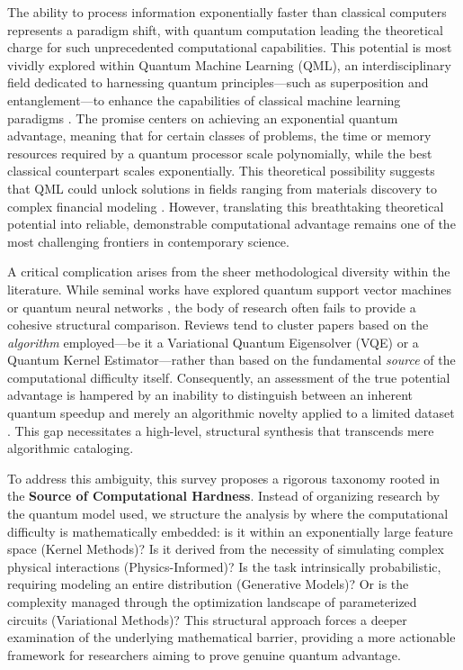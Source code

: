 \documentclass{article}
\begin{document}
\label{sec:introduction}

The ability to process information exponentially faster than classical computers represents a paradigm shift, with quantum computation leading the theoretical charge for such unprecedented computational capabilities. This potential is most vividly explored within Quantum Machine Learning (QML), an interdisciplinary field dedicated to harnessing quantum principles---such as superposition and entanglement---to enhance the capabilities of classical machine learning paradigms \cite{zeguendry2023quantum}. The promise centers on achieving an exponential quantum advantage, meaning that for certain classes of problems, the time or memory resources required by a quantum processor scale polynomially, while the best classical counterpart scales exponentially. This theoretical possibility suggests that QML could unlock solutions in fields ranging from materials discovery to complex financial modeling \cite{egger2020quantum}. However, translating this breathtaking theoretical potential into reliable, demonstrable computational advantage remains one of the most challenging frontiers in contemporary science.

A critical complication arises from the sheer methodological diversity within the literature. While seminal works have explored quantum support vector machines  or quantum neural networks \cite{chakraborty2020analytical}, the body of research often fails to provide a cohesive structural comparison. Reviews tend to cluster papers based on the \textit{algorithm} employed---be it a Variational Quantum Eigensolver (VQE) or a Quantum Kernel Estimator---rather than based on the fundamental \textit{source} of the computational difficulty itself. Consequently, an assessment of the true potential advantage is hampered by an inability to distinguish between an inherent quantum speedup and merely an algorithmic novelty applied to a limited dataset \cite{raubitzek2023applicability}. This gap necessitates a high-level, structural synthesis that transcends mere algorithmic cataloging.

To address this ambiguity, this survey proposes a rigorous taxonomy rooted in the \textbf{Source of Computational Hardness}. Instead of organizing research by the quantum model used, we structure the analysis by where the computational difficulty is mathematically embedded: is it within an exponentially large feature space (Kernel Methods)? Is it derived from the necessity of simulating complex physical interactions (Physics-Informed)? Is the task intrinsically probabilistic, requiring modeling an entire distribution (Generative Models)? Or is the complexity managed through the optimization landscape of parameterized circuits (Variational Methods)? This structural approach forces a deeper examination of the underlying mathematical barrier, providing a more actionable framework for researchers aiming to prove genuine quantum advantage.
\end{document}

